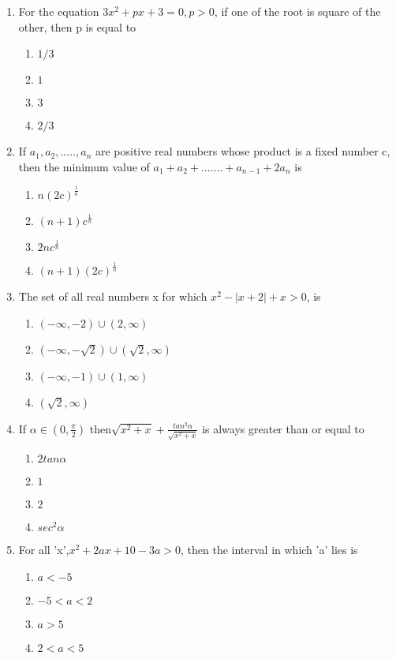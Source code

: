 \documentclass[journal,12pt,twocolumn]{IEEEtran}
\begin{document}
\begin{enumerate}[label=\arabic*]
\item For the equation $3x^{2}+px+3=0, p>0$, if one of the root is square of the other, then p is equal to
\begin{enumerate}
\item $1/3$
\item $1$ 
\item $3$
\item $2/3$
\end{enumerate}

\item If $a_1, a_2,.....,a_n$ are positive real numbers whose product is a fixed number c, then the minimum value of $a_1+a_2+.......+a_{n-1}+2a_n$ is
\begin{enumerate}
\item $n(2c)^{\frac{1}{n}}$
\item $(n+1)c^\frac{1}{n}$ 
\item $2nc^\frac{1}{n}$
\item $(n+1)(2c)^\frac{1}{n}$
\end{enumerate}

\item The set of all real numbers x for which $x^{2}-|x+2|+x>0$, is
\begin{enumerate}
\item $(-\infty,-2)\cup(2,\infty)$
\item $(-\infty,-\sqrt2)\cup(\sqrt2,\infty)$ 
\item $(-\infty,-1)\cup(1,\infty)$
\item $(\sqrt2,\infty)$ 
\end{enumerate}

\item If $\alpha \in(0,\frac{\pi}{2})$ then$\sqrt{x^{2}+x}+\frac{tan^{2}\alpha}{\sqrt{x^{2}+x}}$ is always greater than or equal to 
\begin{enumerate}
\item $2tan\alpha$
\item $1$ 
\item $2$
\item $sec^{2}\alpha$ 
\end{enumerate}

\item For all 'x',$x^{2}+2ax+10-3a>0$, then the interval in which 'a' lies is 
\begin{enumerate}
\item $a<-5$
\item $-5<a<2$ 
\item $a>5$
\item $2<a<5$
\end{enumerate}


\end{enumerate}
\end{document}

